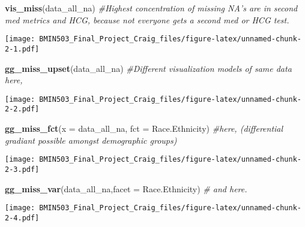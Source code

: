 \documentclass[]{article}
\newenvironment{Shaded}{\begin{snugshade}}{\end{snugshade}}
\newcommand{\KeywordTok}[1]{\textcolor[rgb]{0.13,0.29,0.53}{\textbf{#1}}}
\newcommand{\DataTypeTok}[1]{\textcolor[rgb]{0.13,0.29,0.53}{#1}}
\newcommand{\StringTok}[1]{\textcolor[rgb]{0.31,0.60,0.02}{#1}}
\newcommand{\CommentTok}[1]{\textcolor[rgb]{0.56,0.35,0.01}{\textit{#1}}}
\newcommand{\OperatorTok}[1]{\textcolor[rgb]{0.81,0.36,0.00}{\textbf{#1}}}
\newcommand{\NormalTok}[1]{#1}
\begin{document}
\begin{Shaded}
\begin{Highlighting}[]
\KeywordTok{vis_miss}\NormalTok{(data_all_na) }\CommentTok{#Highest concentration of missing NA's are in second med metrics and HCG, because not everyone gets a second med or HCG test. }
\end{Highlighting}
\end{Shaded}

\texttt{[image: BMIN503\_Final\_Project\_Craig\_files/figure-latex/unnamed-chunk-2-1.pdf]}

\begin{Shaded}
\begin{Highlighting}[]
\KeywordTok{gg_miss_upset}\NormalTok{(data_all_na) }\CommentTok{#Different visualization models of same data here,}
\end{Highlighting}
\end{Shaded}

\texttt{[image: BMIN503\_Final\_Project\_Craig\_files/figure-latex/unnamed-chunk-2-2.pdf]}

\begin{Shaded}
\begin{Highlighting}[]
\KeywordTok{gg_miss_fct}\NormalTok{(}\DataTypeTok{x =}\NormalTok{ data_all_na, }\DataTypeTok{fct =}\NormalTok{ Race.Ethnicity) }\CommentTok{#here, (differential gradiant possible amongst demographic groups)}
\end{Highlighting}
\end{Shaded}

\texttt{[image: BMIN503\_Final\_Project\_Craig\_files/figure-latex/unnamed-chunk-2-3.pdf]}

\begin{Shaded}
\begin{Highlighting}[]
\KeywordTok{gg_miss_var}\NormalTok{(data_all_na,}\DataTypeTok{facet =}\NormalTok{ Race.Ethnicity) }\CommentTok{# and here. }
\end{Highlighting}
\end{Shaded}

\texttt{[image: BMIN503\_Final\_Project\_Craig\_files/figure-latex/unnamed-chunk-2-4.pdf]}

\begin{Shaded}
\end{Shaded}
\end{document}
